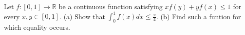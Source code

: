 Let $f: [0,1]\rightarrow\mathbb{R}$ be a continuous function satisfying $xf(y)+yf(x)\le 1$ for every $x,y\in[0,1]$.
(a) Show that $\int^1_0 f(x)dx \le \frac{\pi}4$.
(b) Find such a funtion for which equality occurs.
